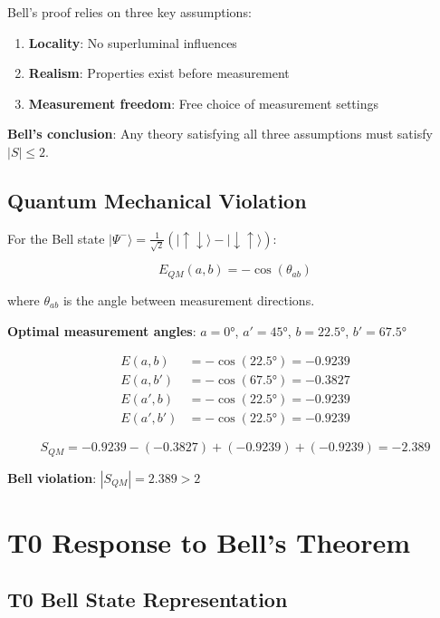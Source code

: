 \documentclass[12pt,a4paper]{article}
\begin{document}
	Bell's proof relies on three key assumptions:
	
	\begin{enumerate}
		\item \textbf{Locality}: No superluminal influences
		\item \textbf{Realism}: Properties exist before measurement
		\item \textbf{Measurement freedom}: Free choice of measurement settings
	\end{enumerate}
	
	\textbf{Bell's conclusion}: Any theory satisfying all three assumptions must satisfy $|S| \leq 2$.
	
	\subsection{Quantum Mechanical Violation}
	
	For the Bell state $|\Psi^-\rangle = \frac{1}{\sqrt{2}}(|\uparrow\downarrow\rangle - |\downarrow\uparrow\rangle)$:
	
	\begin{equation}
		E_{QM}(a,b) = -\cos(\theta_{ab})
	\end{equation}
	
	where $\theta_{ab}$ is the angle between measurement directions.
	
	\textbf{Optimal measurement angles}: $a = 0°$, $a' = 45°$, $b = 22.5°$, $b' = 67.5°$
	
	\begin{align}
		E(a,b) &= -\cos(22.5°) = -0.9239 \\
		E(a,b') &= -\cos(67.5°) = -0.3827 \\
		E(a',b) &= -\cos(22.5°) = -0.9239 \\
		E(a',b') &= -\cos(22.5°) = -0.9239
	\end{align}
	
	\begin{equation}
		S_{QM} = -0.9239 - (-0.3827) + (-0.9239) + (-0.9239) = -2.389
	\end{equation}
	
	\textbf{Bell violation}: $|S_{QM}| = 2.389 > 2$
	
	\section{T0 Response to Bell's Theorem}
	
	\subsection{T0 Bell State Representation}
	
\end{document}
